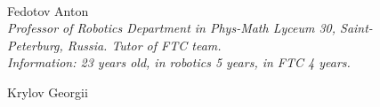\begin{figure}[H]
	\begin{minipage}[h]{0.47\linewidth}
		\\
	\end{minipage}
	\hfill
	\begin{minipage}{0.47\linewidth}
		Fedotov Anton \\ 
		\emph{Professor of Robotics Department in Phys-Math Lyceum 30, Saint-Peterburg, Russia. Tutor of FTC team. \\}
		\emph{Information: 23 years old, in robotics 5 years, in FTC 4 years.}
	\end{minipage}	
	\vfill 
	\begin{minipage}{0.47\linewidth}
		Krylov Georgii \\ 

\end{minipage}
\end{figure}
